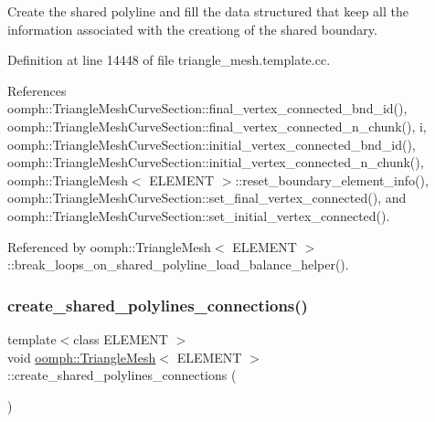 Create the shared polyline and fill the data structured that keep all the information associated with the creationg of the shared boundary. 



Definition at line 14448 of file triangle\+\_\+mesh.\+template.\+cc.



References oomph\+::\+Triangle\+Mesh\+Curve\+Section\+::final\+\_\+vertex\+\_\+connected\+\_\+bnd\+\_\+id(), oomph\+::\+Triangle\+Mesh\+Curve\+Section\+::final\+\_\+vertex\+\_\+connected\+\_\+n\+\_\+chunk(), i, oomph\+::\+Triangle\+Mesh\+Curve\+Section\+::initial\+\_\+vertex\+\_\+connected\+\_\+bnd\+\_\+id(), oomph\+::\+Triangle\+Mesh\+Curve\+Section\+::initial\+\_\+vertex\+\_\+connected\+\_\+n\+\_\+chunk(), oomph\+::\+Triangle\+Mesh$<$ E\+L\+E\+M\+E\+N\+T $>$\+::reset\+\_\+boundary\+\_\+element\+\_\+info(), oomph\+::\+Triangle\+Mesh\+Curve\+Section\+::set\+\_\+final\+\_\+vertex\+\_\+connected(), and oomph\+::\+Triangle\+Mesh\+Curve\+Section\+::set\+\_\+initial\+\_\+vertex\+\_\+connected().



Referenced by oomph\+::\+Triangle\+Mesh$<$ E\+L\+E\+M\+E\+N\+T $>$\+::break\+\_\+loops\+\_\+on\+\_\+shared\+\_\+polyline\+\_\+load\+\_\+balance\+\_\+helper().

\mbox{\label{classoomph_1_1TriangleMesh_a2645a78aa55dacf39530dd087d894d79}} 
\subsubsection{\texorpdfstring{create\+\_\+shared\+\_\+polylines\+\_\+connections()}{create\_shared\_polylines\_connections()}}
{\footnotesize\ttfamily template$<$class E\+L\+E\+M\+E\+NT $>$ \\
void \hyperlink{classoomph_1_1TriangleMesh}{oomph\+::\+Triangle\+Mesh}$<$ E\+L\+E\+M\+E\+NT $>$\+::create\+\_\+shared\+\_\+polylines\+\_\+connections (\begin{DoxyParamCaption}{ }\end{DoxyParamCaption})\hspace{0.3cm}{\ttfamily [protected]}}



